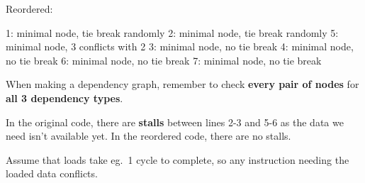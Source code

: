 \documentclass[a4paper, 11pt]{article}
\begin{document}
{\begin{minipage}[t]{0.2\textwidth}
    \end{minipage}
    \hspace{3mm}
    \begin{minipage}[t]{0.45\textwidth}
    Reordered:
    \vspace{-5mm}
    \begin{monospacefigure}
    1: minimal node, tie break randomly
    2: minimal node, tie break randomly
    5: minimal node, 3 conflicts with 2
    3: minimal node, no tie break
    4: minimal node, no tie break
    6: minimal node, no tie break
    7: minimal node, no tie break
    \end{monospacefigure}
    \end{minipage}

    When making a dependency graph, remember to check \textbf{every pair of nodes} for \textbf{all 3 dependency types}.

    In the original code, there are \textbf{stalls} between lines 2-3 and 5-6 as the data we need isn't available yet. In the reordered code, there are no stalls.

    Assume that loads take eg.\ 1 cycle to complete, so any instruction needing the loaded data conflicts.
}
\end{document}
